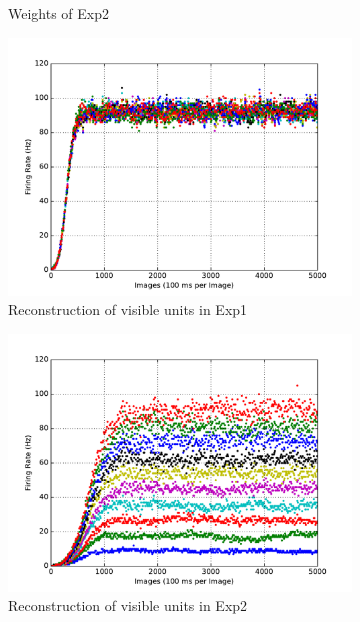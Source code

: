 \begin{figure}
\begin{subfigure}[t]{0.4\textwidth}
		\caption{Weights of Exp2}
	\end{subfigure}
	\begin{subfigure}[t]{0.4\textwidth}
		\includegraphics[width=\textwidth]{pics_sdlm/03_exp_SAE_noise_long/exp1_recon_s.pdf}
		\caption{Reconstruction of visible units in Exp1}
	\end{subfigure}
	\begin{subfigure}[t]{0.4\textwidth}
		\includegraphics[width=\textwidth]{pics_sdlm/03_exp_SAE_noise_long/exp2_recon_s.pdf}
		\caption{Reconstruction of visible units in Exp2}
	\end{subfigure}\\
	\begin{subfigure}[t]{0.4\textwidth}

\end{subfigure}
\end{figure}
